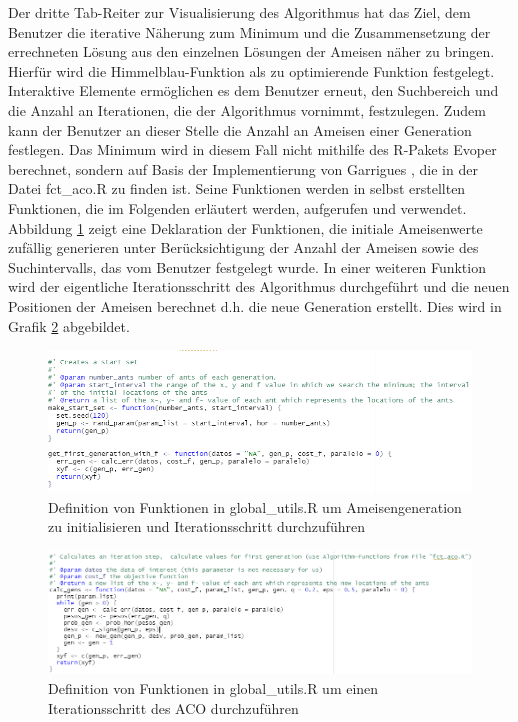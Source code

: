 Der dritte Tab-Reiter zur Visualisierung des Algorithmus hat das Ziel, dem Benutzer die iterative Näherung zum Minimum und die Zusammensetzung der errechneten Lösung aus den einzelnen Lösungen der Ameisen näher zu bringen. Hierfür wird die Himmelblau-Funktion als zu optimierende Funktion festgelegt. Interaktive Elemente ermöglichen es dem Benutzer erneut, den Suchbereich und die Anzahl an Iterationen, die der Algorithmus vornimmt, festzulegen. Zudem kann der Benutzer an dieser Stelle die Anzahl an Ameisen einer Generation festlegen. 
Das Minimum wird in diesem Fall nicht mithilfe des R-Pakets Evoper berechnet, sondern auf Basis der Implementierung von Garrigues \citep{Garrigues2019}, die in der Datei fct\_aco.R zu finden ist. Seine Funktionen werden in selbst erstellten Funktionen, die im Folgenden erläutert werden, aufgerufen und verwendet. 
Abbildung \ref{fig:makeStartGen} zeigt eine Deklaration der Funktionen, die initiale Ameisenwerte zufällig generieren unter Berücksichtigung der Anzahl der Ameisen sowie des Suchintervalls, das vom Benutzer festgelegt wurde.
In einer weiteren Funktion wird der eigentliche Iterationsschritt des Algorithmus durchgeführt und die neuen Positionen der Ameisen berechnet d.h. die neue Generation erstellt. Dies wird in Grafik \ref{fig:util_makeNewGen} abgebildet.


\begin{figure}[H]
 \centering
 \includegraphics[scale=.7]{"images/04_Visualisierung_des_Algorithmus/util_makeStartGen.png"}
 \caption{Definition von Funktionen in global\_utils.R um Ameisengeneration zu initialisieren und Iterationsschritt durchzuführen}
 \label{fig:makeStartGen}
\end{figure}

\begin{figure}[H]
 \centering
 \includegraphics[scale=0.7]{"images/04_Visualisierung_des_Algorithmus/util_makeNewGen.png"}
 \caption{Definition von Funktionen in global\_utils.R um einen Iterationsschritt des ACO durchzuführen}
 \label{fig:util_makeNewGen}
\end{figure}

